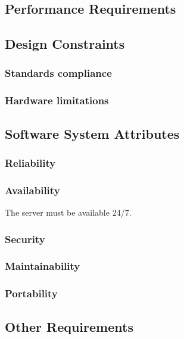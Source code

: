 \documentclass[a4paper,11pt]{report} %
\begin{document}
	\subsection{Performance Requirements}
	
	\subsection{Design Constraints}
	
	\subsubsection{Standards compliance}
	
	\subsubsection{Hardware limitations}
	
	\subsection{Software System Attributes}
	
	\subsubsection{Reliability}
	
	\subsubsection{Availability} The server must be available 24/7.
	
	\subsubsection{Security}
	
	\subsubsection{Maintainability}

	\subsubsection{Portability}
	
	\subsection{Other Requirements}
	
	
\end{document}
